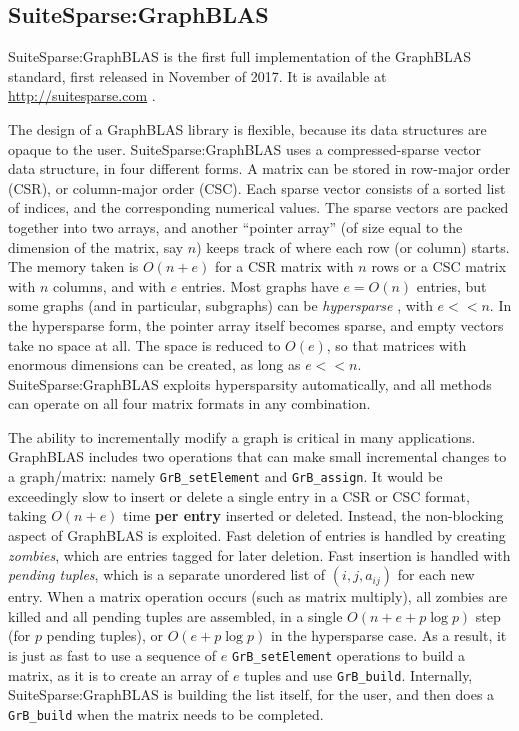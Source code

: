 
\subsection{SuiteSparse:GraphBLAS}

SuiteSparse:GraphBLAS is the first full implementation of the GraphBLAS
standard, first released in November of 2017.
It is available at \url{http://suitesparse.com} \cite{Davis19}.

The design of a GraphBLAS library is flexible, because its data structures are
opaque to the user.  SuiteSparse:GraphBLAS uses a compressed-sparse vector
data structure, in four different forms.  A matrix can be stored in
row-major order (CSR), or column-major order (CSC).  Each sparse vector
consists of a sorted list of indices, and the corresponding numerical values.
The sparse vectors are packed together into two arrays, and another ``pointer
array'' (of size equal to the dimension of the matrix, say $n$) keeps track of
where each row (or column) starts.  The memory taken is $O(n+e)$ for a CSR
matrix with $n$ rows or a CSC matrix with $n$ columns, and with $e$ entries.
Most graphs have $e=O(n)$ entries, but some graphs (and in particular,
subgraphs) can be {\em hypersparse} \cite{BulucGilbert08}, with $e << n$.  In
the hypersparse form, the pointer array itself becomes sparse, and empty
vectors take no space at all.  The space is reduced to $O(e)$, so that
matrices with enormous dimensions can be created, as long as $e << n$.
SuiteSparse:GraphBLAS exploits hypersparsity automatically, and all
methods can operate on all four matrix formats in any combination.

The ability to incrementally modify a graph is critical in many applications.
GraphBLAS includes two operations that can make small incremental changes to a
graph/matrix:  namely \verb'GrB_setElement' and \verb'GrB_assign'.  It would be
exceedingly slow to insert or delete a single entry in a CSR or CSC format,
taking $O(n+e)$ time {\bf per entry} inserted or deleted.  Instead, the
non-blocking aspect of GraphBLAS is exploited.  Fast deletion of entries is
handled by creating {\em zombies}, which are entries tagged for later deletion.
Fast insertion is handled with {\em pending tuples}, which is a separate
unordered list of $(i,j,a_{ij})$ for each new entry.  When a matrix operation
occurs (such as matrix multiply), all zombies are killed and all pending tuples
are assembled, in a single $O(n+ e + p \log p)$ step (for $p$ pending tuples),
or $O(e +p \log p)$ in the hypersparse case.  As a result, it is just as fast
to use a sequence of $e$ \verb'GrB_setElement' operations to build a matrix, as
it is to create an array of $e$ tuples and use \verb'GrB_build'.  Internally,
SuiteSparse:GraphBLAS is building the list itself, for the user, and then does
a \verb'GrB_build' when the matrix needs to be completed.


